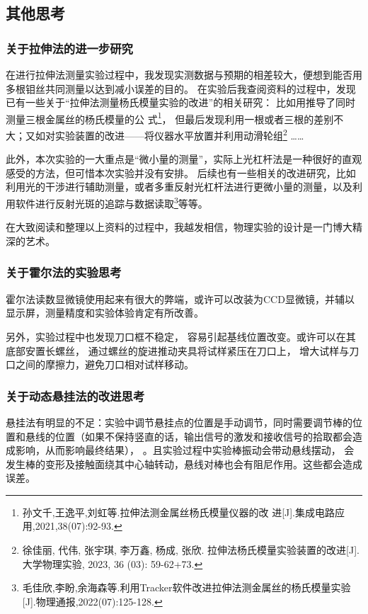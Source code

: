 \documentclass[11pt]{article}
\begin{document}
\subsection{其他思考}

\subsubsection{关于拉伸法的进一步研究}

在进行拉伸法测量实验过程中，我发现实测数据与预期的相差较大，便想到能否用多根钼丝共同测量以达到减小误差的目的。
在实验后我查阅资料的过程中，发现已有一些关于“拉伸法测量杨氏模量实验的改进”的相关研究：
比如用推导了同时测量三根金属丝的杨氏模量的公
式\footnote[1]{孙文千,王逸平,刘虹等.拉伸法测金属丝杨氏模量仪器的改
进[J].集成电路应用,2021,38(07):92-93.}，
但最后发现利用一根或者三根的差别不大；又如对实验装置的改进——将仪器水平放置并利用动滑轮组\footnote[2]{徐佳丽, 代伟, 张宇琪, 李万鑫, 杨成, 张欣. 拉伸法杨氏模量实验装置的改进[J]. 大学物理实验, 2023, 36 (03): 59-62+73.}
……

此外，本次实验的一大重点是“微小量的测量”，实际上光杠杆法是一种很好的直观感受的方法，但可惜本次实验并没有安排。
后续也有一些相关的改进研究，比如利用光的干涉进行辅助测量，或者多重反射光杠杆法进行更微小量的测量，以及利用软件进行反射光斑的追踪与数据读取\footnote[3]{毛佳欣,李盼,余海森等.利用Tracker软件改进拉伸法测金属丝的杨氏模量实验[J].物理通报,2022(07):125-128.}等等。

在大致阅读和整理以上资料的过程中，我越发相信，物理实验的设计是一门博大精深的艺术。

\subsubsection{关于霍尔法的实验思考}

霍尔法读数显微镜使用起来有很大的弊端，或许可以改装为CCD显微镜，并辅以显示屏，测量精度和实验体验肯定有所改善。

另外，实验过程中也发现刀口框不稳定，
容易引起基线位置改变。或许可以在其底部安置长螺丝，
通过螺丝的旋进推动夹具将试样紧压在刀口上，
增大试样与刀口之间的摩擦力，避免刀口相对试样移动。



\subsubsection{关于动态悬挂法的改进思考}

悬挂法有明显的不足：实验中调节悬挂点的位置是手动调节，同时需要调节棒的位置和悬线的位置（如果不保持竖直的话，输出信号的激发和接收信号的拾取都会造成影响，从而影响最终结果），
。且实验过程中实验棒振动会带动悬线摆动，
会发生棒的变形及接触面绕其中心轴转动，悬线对棒也会有阻尼作用。这些都会造成误差。
\end{document}
